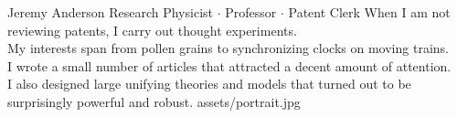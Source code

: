 \documentclass[theme]{cv_einstein}
\begin{document}
    \header
    {Jeremy Anderson}
    {Research Physicist $\cdot$ Professor $\cdot$ Patent Clerk}
    {
        When I am not reviewing patents, I carry out thought experiments.\\
        My interests span from pollen grains to synchronizing clocks on moving trains.\\
        I wrote a small number of articles that attracted a decent amount of attention.\\
        I also designed large unifying theories and models that turned out to be\\
        surprisingly powerful and robust.%
    }
    {assets/portrait.jpg}


    \vspace{\headerheight} %
\end{document}
